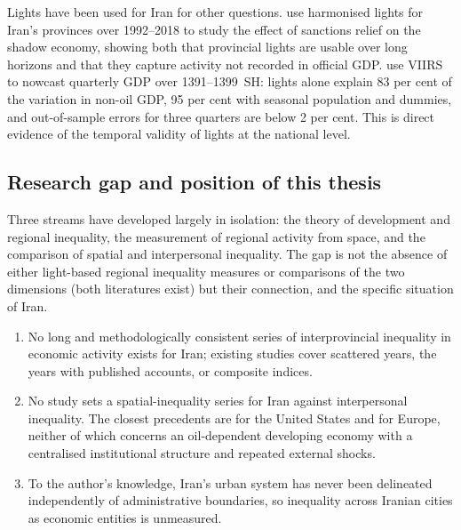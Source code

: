\documentclass[11pt,a4paper]{article}
\begin{document}
Lights have been used for Iran for other questions. \citet{FarzaneganFischer2021} use harmonised lights for Iran's provinces over 1992--2018 to study the effect of sanctions relief on the shadow economy, showing both that provincial lights are usable over long horizons and that they capture activity not recorded in official GDP. \citet{FouladgarFeizi2023} use VIIRS to nowcast quarterly GDP over 1391--1399~SH: lights alone explain 83 per cent of the variation in non-oil GDP, 95 per cent with seasonal population and dummies, and out-of-sample errors for three quarters are below 2 per cent. This is direct evidence of the temporal validity of lights at the national level.

\subsection{Research gap and position of this thesis}\label{sec:gap}

Three streams have developed largely in isolation: the theory of development and regional inequality, the measurement of regional activity from space, and the comparison of spatial and interpersonal inequality. The gap is not the absence of either light-based regional inequality measures or comparisons of the two dimensions (both literatures exist) but their connection, and the specific situation of Iran.

\begin{keybox}[title={Research gap}]
\begin{enumerate}[label=\arabic*.,leftmargin=1.2em]
\item No long and methodologically consistent series of interprovincial inequality in economic activity exists for Iran; existing studies cover scattered years, the years with published accounts, or composite indices.
\item No study sets a spatial-inequality series for Iran against interpersonal inequality. The closest precedents are \citet{Rey2018} for the United States and \citet{CapelloCerisola2024} for Europe, neither of which concerns an oil-dependent developing economy with a centralised institutional structure and repeated external shocks.
\item To the author's knowledge, Iran's urban system has never been delineated independently of administrative boundaries, so inequality across Iranian cities as economic entities is unmeasured.
\end{enumerate}
\end{keybox}
\end{document}
